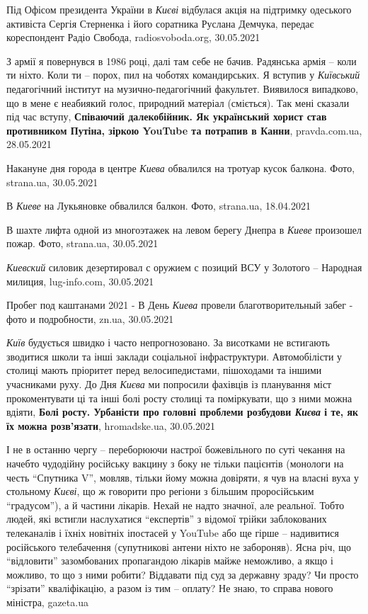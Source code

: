 Під Офісом президента України в \emph{Києві} відбулася акція на підтримку
одеського активіста Сергія Стерненка і його соратника Руслана Демчука, передає
кореспондент Радіо Свобода, radiosvoboda.org, 30.05.2021

З армії я повернувся в 1986 році, далі там себе не бачив. Радянська армія –
коли ти ніхто. Коли ти – порох, пил на чоботях командирських.  Я вступив у
\emph{Київський} педагогічний інститут на музично-педагогічний факультет.
Виявилося випадково, що в мене є неабиякий голос, природний матеріал
(сміється). Так мені сказали під час вступу, \textbf{Співаючий далекобійник. Як
український хорист став противником Путіна, зіркою YouTube та потрапив в
Канни}, pravda.com.ua, 28.05.2021

Накануне дня города в центре \emph{Киева} обвалился на тротуар кусок балкона.
Фото, strana.ua, 30.05.2021

В \emph{Киеве} на Лукьяновке обвалился балкон. Фото, strana.ua, 18.04.2021

В шахте лифта одной из многоэтажек на левом берегу Днепра в \emph{Киеве} произошел
пожар. Фото, strana.ua, 30.05.2021

\emph{Киевский} силовик дезертировал с оружием с позиций ВСУ у Золотого –
Народная милиция, lug-info.com, 30.05.2021

Пробег под каштанами 2021 - В День \emph{Киева} провели благотворительный забег
- фото и подробности, zn.ua, 30.05.2021

\emph{Київ} будується швидко і часто непрогнозовано. За висотками не встигають
зводитися школи та інші заклади соціальної інфраструктури. Автомобілісти у
столиці мають пріоритет перед велосипедистами, пішоходами та іншими учасниками
руху.  До Дня \emph{Києва} ми попросили фахівців із планування міст
прокоментувати ці та інші болі росту столиці та поміркувати, що з ними можна
вдіяти, \textbf{Болі росту. Урбаністи про головні проблеми розбудови
\emph{Києва} і те, як їх можна розв'язати}, hromadske.ua, 30.05.2021

І не в останню чергу – переборюючи настрої божевільного по суті чекання на
начебто чудодійну російську вакцину з боку не тільки пацієнтів (монологи на
честь \enquote{Спутника V}, мовляв, тільки йому можна довіряти, я чув на власні
вуха у стольному \emph{Києві}, що ж говорити про регіони з більшим
проросійським \enquote{градусом}), а й частини лікарів. Нехай не надто значної,
але реальної. Тобто людей, які встигли наслухатися \enquote{експертів} з відомої трійки
заблокованих телеканалів і їхніх новітніх іпостасей у YouTube або ще гірше –
надивитися російського телебачення (супутникові антени ніхто не забороняв).
Ясна річ, що \enquote{відловити} зазомбованих пропагандою лікарів майже неможливо, а
якщо і можливо, то що з ними робити? Віддавати під суд за державну зраду? Чи
просто \enquote{зрізати} кваліфікацію, а разом із тим – оплату? Не знаю, то справа
нового міністра, gazeta.ua

